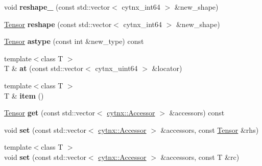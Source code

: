 \begin{DoxyCompactItemize}
\mbox{\label{classcytnx_1_1Tensor_a3723449528b9a20dd46c32c9e042b8f0}} 
void {\bfseries reshape\+\_\+} (const std\+::vector$<$ cytnx\+\_\+int64 $>$ \&new\+\_\+shape)
\item 
\mbox{\label{classcytnx_1_1Tensor_a182f8f7b3ae3d0db8ed55d2adf8c6b45}} 
\hyperlink{classcytnx_1_1Tensor}{Tensor} {\bfseries reshape} (const std\+::vector$<$ cytnx\+\_\+int64 $>$ \&new\+\_\+shape)
\item 
\mbox{\label{classcytnx_1_1Tensor_a7b996d3281e7375b29a7cfe4273b299f}} 
\hyperlink{classcytnx_1_1Tensor}{Tensor} {\bfseries astype} (const int \&new\+\_\+type) const
\item 
\mbox{\label{classcytnx_1_1Tensor_a697b114d1df390ca558ea9211c2d683b}} 
{\footnotesize template$<$class T $>$ }\\T \& {\bfseries at} (const std\+::vector$<$ cytnx\+\_\+uint64 $>$ \&locator)
\item 
\mbox{\label{classcytnx_1_1Tensor_a7b686c6641c3c1eeb2d34cb7c09e433b}} 
{\footnotesize template$<$class T $>$ }\\T \& {\bfseries item} ()
\item 
\mbox{\label{classcytnx_1_1Tensor_ad7b928e4cb89d40cbd99aefab9aa0075}} 
\hyperlink{classcytnx_1_1Tensor}{Tensor} {\bfseries get} (const std\+::vector$<$ \hyperlink{classcytnx_1_1Accessor}{cytnx\+::\+Accessor} $>$ \&accessors) const
\item 
\mbox{\label{classcytnx_1_1Tensor_a771f1f5b51f89abd8df4166e602214ac}} 
void {\bfseries set} (const std\+::vector$<$ \hyperlink{classcytnx_1_1Accessor}{cytnx\+::\+Accessor} $>$ \&accessors, const \hyperlink{classcytnx_1_1Tensor}{Tensor} \&rhs)
\item 
\mbox{\label{classcytnx_1_1Tensor_ad93d654b978add6b2f0dfb9f91490209}} 
{\footnotesize template$<$class T $>$ }\\void {\bfseries set} (const std\+::vector$<$ \hyperlink{classcytnx_1_1Accessor}{cytnx\+::\+Accessor} $>$ \&accessors, const T \&rc)
\item 

\end{DoxyCompactItemize}
